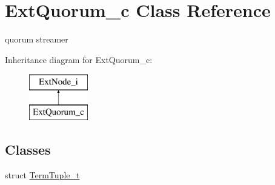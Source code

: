 \hypertarget{classExtQuorum__c}{\section{Ext\-Quorum\-\_\-c Class Reference}
\label{classExtQuorum__c}
}


quorum streamer  


Inheritance diagram for Ext\-Quorum\-\_\-c\-:\begin{figure}[H]
\begin{center}
\leavevmode
\includegraphics[height=2.000000cm]{classExtQuorum__c}
\end{center}
\end{figure}
\subsection*{Classes}
\begin{DoxyCompactItemize}
\item 
struct \hyperlink{structExtQuorum__c_1_1TermTuple__t}{Term\-Tuple\-\_\-t}
\end{DoxyCompactItemize}
